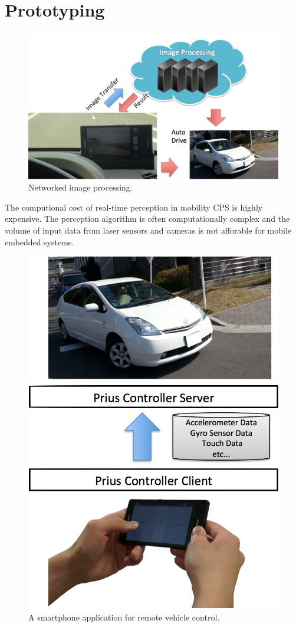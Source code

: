 \section{Prototyping}
\label{sec:prototype}

\begin{figure}[!t]
 \centering
 \includegraphics[width=\hsize]{fig/TIPIC.pdf}
 \caption{Networked image processing.}
 \label{fig:tipic}
\end{figure}

The computional cost of real-time perception in mobility CPS is highly
expensive.
The perception algorithm is often computationally complex and the volume
of input data from laser sensors and cameras is not afforable for mobile
embedded systems.

\begin{figure}[!t]
 \centering
 \includegraphics[width=0.75\hsize]{fig/Andrive.pdf}
 \caption{A smartphone application for remote vehicle control.}
 \label{fig:andrive}
\end{figure}

